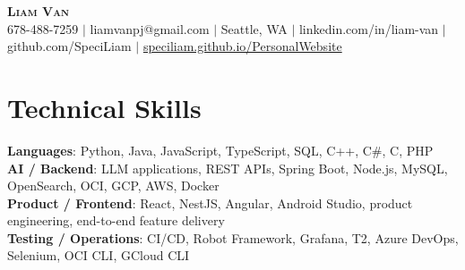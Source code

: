 \documentclass[letterpaper,11pt]{article}
\begin{document}

%
\begin{center}
    \textbf{\Huge \scshape Liam Van} \\ \vspace{1pt}
    \small 678-488-7259 $|$ \small {liamvanpj@gmail.com} $|$ Seattle, WA
 {{$|$ linkedin.com/in/liam-van} {$|$ github.com/SpeciLiam} {$|$ \href{https://speciliam.github.io/PersonalWebsite}{speciliam.github.io/PersonalWebsite}}}

\end{center}

\section{Technical Skills}
 \begin{itemize}[leftmargin=0.15in, label={}]
    \small{\item{
     \textbf{Languages}{: Python, Java, JavaScript, TypeScript, SQL, C++, C\#, C, PHP} \\
     \textbf{AI / Backend}{: LLM applications, REST APIs, Spring Boot, Node.js, MySQL, OpenSearch, OCI, GCP, AWS, Docker} \\
     \textbf{Product / Frontend}{: React, NestJS, Angular, Android Studio, product engineering, end-to-end feature delivery} \\
     \textbf{Testing / Operations}{: CI/CD, Robot Framework, Grafana, T2, Azure DevOps, Selenium, OCI CLI, GCloud CLI} \\
    }}
 \end{itemize}
%
\end{document}

